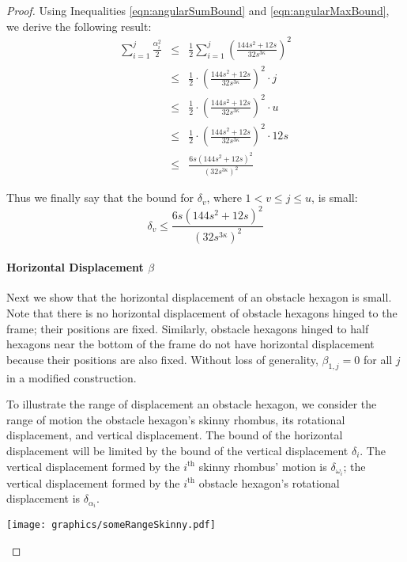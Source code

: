 \documentclass[10pt]{CSUNthesis}
\theoremstyle{plain}%
\theoremstyle{definition}
\theoremstyle{remark}
\newcommand{\ith}{i^\text{th}}
\newcommand{\lr}[1]{\left( #1 \right)}
\begin{document}
\begin{proof}
Using Inequalities \ref{eqn:angularSumBound} and \ref{eqn:angularMaxBound}, we derive the following result:
$$
\begin{array}{rcl}
\sum_{i=1}^j \frac{\alpha_i^2}{2} &\leq& \frac{1}{2}\sum_{i=1}^j  \lr{ \frac{144s^2+12s}{32s^{3\kappa}} }^2\\
&\leq&\frac{1}{2}\cdot  \lr{\frac{144s^2+12s}{32s^{3\kappa}}}^2 \cdot j\\
&\leq&\frac{1}{2}\cdot  \lr{\frac{144s^2+12s}{32s^{3\kappa}}}^2 \cdot u\\
&\leq&\frac{1}{2}\cdot  \lr{\frac{144s^2+12s}{32s^{3\kappa}}}^2 \cdot 12s\\
&\leq&  \frac{6s\lr{144s^2+12s}^2}{\lr{32s^{3\kappa}}^2}
\end{array}
$$

Thus we finally say that the bound for $\delta_v$, where $1<v\leq j\leq u$, is small:
\begin{equation}\label{eqn:verticalBound}
\delta_v \leq \frac{6s\lr{144s^2+12s}^2}{\lr{32s^{3\kappa}}^2}
\end{equation}



\paragraph{Horizontal Displacement $\beta$}

Next we show that the horizontal displacement of an obstacle hexagon is small.  
Note that there is no horizontal displacement of obstacle hexagons hinged to the frame; their positions are fixed.  
Similarly, obstacle hexagons hinged to half hexagons near the bottom of the frame do not have horizontal displacement because their positions are also fixed.  
Without loss of generality, $\beta_{1,j}=0$ for all $j$ in a modified construction.

To illustrate the range of displacement an obstacle hexagon, we consider the range of motion the obstacle hexagon's skinny rhombus, its rotational displacement, and vertical displacement.  
The bound of the horizontal displacement will be limited by the bound of the vertical displacement $\delta_i$.  
The vertical displacement formed by the $\ith$ skinny rhombus' motion is $\delta_{\omega_i}$; the vertical displacement formed by the $\ith$ obstacle hexagon's rotational displacement is $\delta_{\alpha_i}$.

\begin{minipage}{\linewidth}
\begin{center}
\texttt{[image: graphics/someRangeSkinny.pdf]}
\label{fig:someRangeSkinny.pdf}
\end{center}
\end{minipage}


\end{proof}
\end{document}

